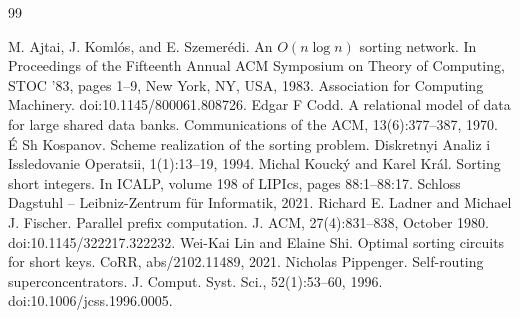 \documentclass[10pt,a4paper]{article}
\begin{document}
\begin{thebibliography}{99}

 M. Ajtai, J. Koml\'os, and E. Szemer\'edi. An $O(n\log n)$ sorting network. In Proceedings of the Fifteenth Annual ACM Symposium on Theory of Computing, STOC '83, pages 1--9, New York, NY, USA, 1983. Association for Computing Machinery. doi:10.1145/800061.808726.
 Edgar F Codd. A relational model of data for large shared data banks. Communications of the ACM, 13(6):377--387, 1970.
 \'E Sh Kospanov. Scheme realization of the sorting problem. Diskretnyi Analiz i Issledovanie Operatsii, 1(1):13--19, 1994.
 Michal Kouck\'y and Karel Kr\'al. Sorting short integers. In ICALP, volume 198 of LIPIcs, pages 88:1--88:17. Schloss Dagstuhl -- Leibniz-Zentrum f\"ur Informatik, 2021.
 Richard E. Ladner and Michael J. Fischer. Parallel prefix computation. J. ACM, 27(4):831--838, October 1980. doi:10.1145/322217.322232.
 Wei-Kai Lin and Elaine Shi. Optimal sorting circuits for short keys. CoRR, abs/2102.11489, 2021.
 Nicholas Pippenger. Self-routing superconcentrators. J. Comput. Syst. Sci., 52(1):53--60, 1996. doi:10.1006/jcss.1996.0005.

\end{thebibliography}
\end{document}
